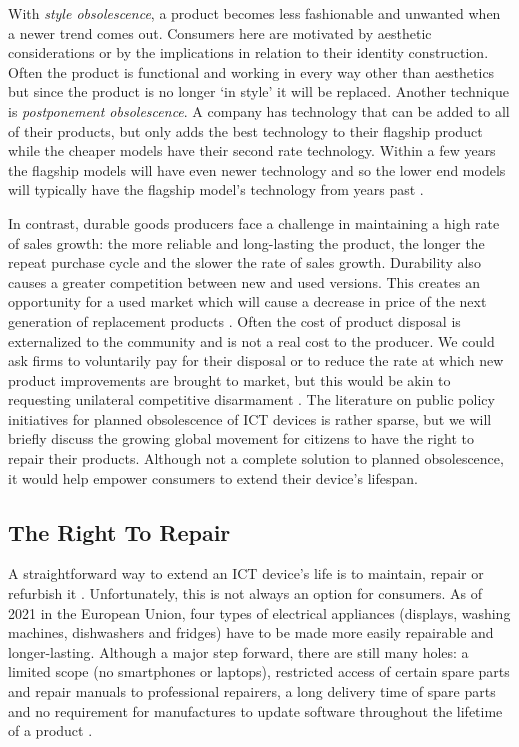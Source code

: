 \documentclass{article}
\begin{document}
With \textit{style obsolescence}, a product becomes less fashionable and unwanted when a newer trend comes out. Consumers here are motivated by aesthetic considerations or by the implications in relation to their identity construction. Often the product is functional and working in every way other than aesthetics but since the product is no longer `in style' it will be replaced. Another technique is \textit{postponement obsolescence}. A company has technology that can be added to all of their products, but only adds the best technology to their flagship product while the cheaper models have their second rate technology. Within a few years the flagship models will have even newer technology and so the lower end models will typically have the flagship model's technology from years past \cite{keeble2013culture}.

In contrast, durable goods producers face a challenge in maintaining a high rate of sales growth: the more reliable and long-lasting the product, the longer the repeat purchase cycle and the slower the rate of sales growth. Durability also causes a greater competition between new and used versions. This creates an opportunity for a used market which will cause a decrease in price of the next generation of replacement products \cite{guiltinan2009creative}. Often the cost of product disposal is externalized to the community and is not a real cost to the producer. We could ask firms to voluntarily pay for their disposal or to reduce the rate at which new product improvements are brought to market, but this would be akin to requesting unilateral competitive disarmament \cite{guiltinan2009creative}. The literature on public policy initiatives for planned obsolescence of ICT devices is rather sparse, but we will briefly discuss the growing global movement for citizens to have the right to repair their products. Although not a complete solution to planned obsolescence, it would help empower consumers to extend their device's lifespan.



\subsection{The Right To Repair}\label{SECTION_RIGHT_TO_REPAIR}
A straightforward way to extend an ICT device's life is to maintain, repair or refurbish it \cite{zerowastecanada2017hierarchy}. Unfortunately, this is not always an option for consumers. As of 2021 in the European Union, four types of electrical appliances (displays, washing machines, dishwashers and fridges) have to be made more easily repairable and longer-lasting. Although a major step forward, there are still many holes: a limited scope (no smartphones or laptops), restricted access of certain spare parts and repair manuals to professional repairers, a long delivery time of spare parts and no requirement for manufactures to update software throughout the lifetime of a product \cite{EUrighttorepair2021}.
\end{document}
